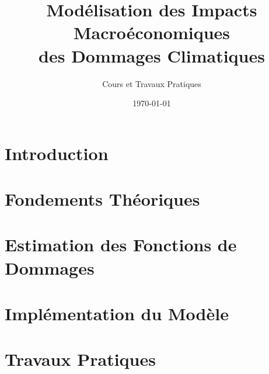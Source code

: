 \documentclass[12pt,a4paper]{book}
\title{Modélisation des Impacts\\Macroéconomiques\\des Dommages Climatiques}
\author{Cours et Travaux Pratiques}
\date{\today}
\begin{document}
\maketitle
\tableofcontents

\chapter{Introduction}


\chapter{Fondements Théoriques}


\chapter{Estimation des Fonctions de Dommages}


\chapter{Implémentation du Modèle}


\chapter{Travaux Pratiques}

\end{document}
